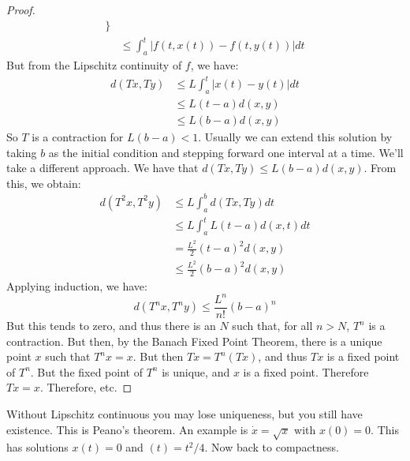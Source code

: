 \documentclass[crop=false,class=article,oneside]{standalone}
\begin{document}
\begin{proof}
\begin{align*}
                    \}\\
                    &\leq\int_{a}^{t}|
                        f(t,x(t))-f(t,y(t))|dt
                \end{align*}
                But from the Lipschitz continuity
                of $f$, we have:
                \begin{align*}
                    d(Tx,Ty)&\leq
                    L\int_{a}^{t}|x(t)-y(t)|dt\\
                    &\leq{L}(t-a)d(x,y)\\
                    &\leq{L}(b-a)d(x,y)
                \end{align*}
                So $T$ is a contraction for
                $L(b-a)<1$. Usually we can
                extend this solution by taking
                $b$ as the initial condition and
                stepping forward one interval
                at a time. We'll take a different
                approach. We have that
                $d(Tx,Ty)\leq{L}(b-a)d(x,y)$. From
                this, we obtain:
                \begin{align*}
                    d(T^{2}x,T^{2}y)
                    &\leq{L}\int_{a}^{b}d(Tx,Ty)dt\\
                    &\leq{L}\int_{a}^{t}
                        L(t-a)d(x,t)dt\\
                    &=\frac{L^{2}}{2}(t-a)^{2}d(x,y)\\
                    &\leq
                    \frac{L^{2}}{2}(b-a)^{2}d(x,y)
                \end{align*}
                Applying induction, we have:
                \begin{equation*}
                    d(T^{n}x,T^{n}y)
                    \leq\frac{L^{n}}{n!}(b-a)^{n}
                \end{equation*}
                But this tends to zero, and thus
                there is an $N$ such that,
                for all $n>N$, $T^{n}$ is a
                contraction. But then, by the
                Banach Fixed Point Theorem, there
                is a unique point $x$ such that
                $T^{n}x=x$. But then
                $Tx=T^{n}(Tx)$, and thus
                $Tx$ is a fixed point of
                $T^{n}$. But the fixed point of
                $T^{n}$ is unique, and $x$ is a
                fixed point. Therefore
                $Tx=x$. Therefore, etc.
            \end{proof}
            Without Lipschitz continuous you may
            lose uniqueness, but you still have
            existence. This is Peano's theorem.
            An example is $\dot{x}=\sqrt{x}$
            with $x(0)=0$.
            This has solutions $x(t)=0$ and
            $(t)=t^{2}/4$. Now back to compactness.
\end{document}
